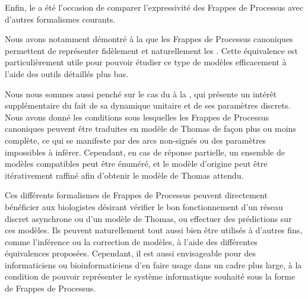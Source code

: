 \myskip

Enfin, le  a été l'occasion de comparer l'expressivité des
Frappes de Processus avec d'autres formalismes courants.

Nous avons notamment démontré à la  que les Frappes de Processus canoniques
permettent de représenter fidèlement et naturellement les .
Cette équivalence est particulièrement utile pour pouvoir étudier ce type de modèles
efficacement à l'aide des outils détaillés plus bas.

Nous nous sommes aussi penché sur le cas du  à la ,
qui présente un intérêt supplémentaire du fait de sa dynamique unitaire
et de ses paramètres discrets.
Nous avons donné les conditions sous lesquelles les Frappes de Processus canoniques
peuvent être traduites en modèle de Thomas de façon plus ou moins complète,
ce qui se manifeste par des arcs non-signés ou des paramètres impossibles à inférer.
Cependant, en cas de réponse partielle,
un ensemble de modèles compatibles peut être énuméré,
et le modèle d'origine peut être itérativement raffiné afin d'obtenir
le modèle de Thomas attendu.


\myskip

Ces différents formalismes de Frappes de Processus
peuvent directement bénéficier aux biologistes désirant
vérifier le bon fonctionnement d'un réseau discret asynchrone ou d'un modèle de Thomas,
ou effectuer des prédictions sur ces modèles.
Ils peuvent naturellement tout aussi bien être utilisés à d'autres fins,
comme l'inférence ou la correction de modèles, à l'aide des différentes équivalences proposées.
Cependant, il est aussi envisageable pour des informaticiens ou bioinformaticiens
d'en faire usage dans un cadre
plus large, à la condition de pouvoir représenter le système informatique souhaité
sous la forme de Frappes de Processus.



